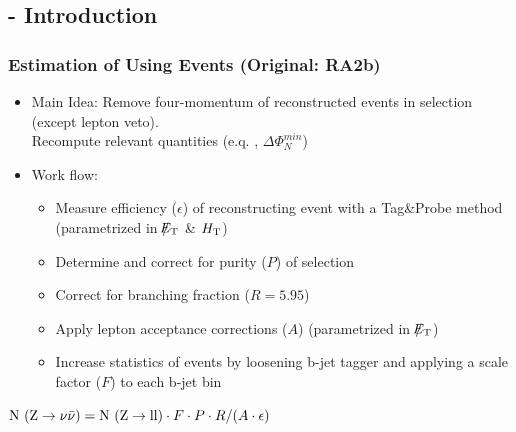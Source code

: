 \documentclass{beamer}
\begin{document}
\subsection{\Zll - Introduction}
\begin{frame}
\frametitle{Estimation of \ZInv  Using \Zll Events \small(Original: RA2b)}
\begin{itemize}
 \item Main Idea: Remove four-momentum of reconstructed \Zll events in selection (except lepton veto).\\ Recompute relevant quantities (e.q. \met, $\Delta\Phi_{N}^{min}$)
 \item Work flow:
 \begin{itemize}
   \item Measure efficiency ($\epsilon$) of reconstructing \Zll event with a Tag\&Probe method (parametrized in $\slash\mkern-12mu{E}_{\text{T}}$ \& $H_{\text{T}}$)
  \item Determine and correct for purity ($P$) of \Zll selection
  \item Correct for branching fraction ($R = 5.95$)
  \item Apply lepton acceptance corrections ($A$) (parametrized in $\slash\mkern-12mu{E}_{\text{T}}$)
  \item Increase statistics of \Zll events by loosening b-jet tagger and applying a scale factor ($F$) to each b-jet bin

 \end{itemize}
\end{itemize}
\begin{block}{}
  \begin{center}
  $\text{N }(\text{Z}\rightarrow\nu\bar{\nu}) = \text{N }(\text{Z}\rightarrow\text{ll})\cdot F \cdot P \cdot R / (A\cdot \epsilon)$
  \end{center}
\end{block}
\end{frame}

\end{document}
